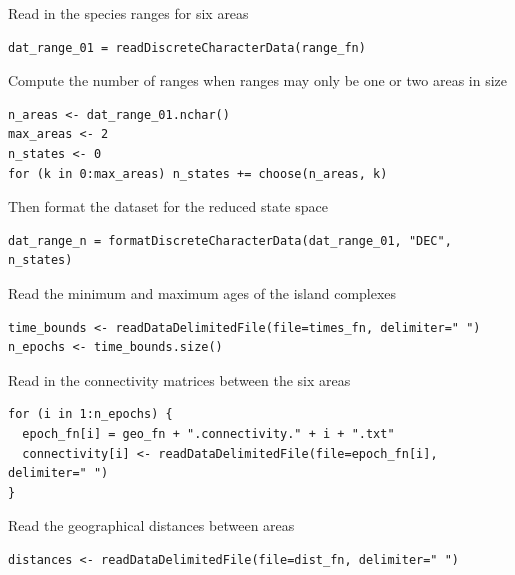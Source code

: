 Read in the species ranges for six areas

\begin{snugshade}
\begin{lstlisting}
dat_range_01 = readDiscreteCharacterData(range_fn)
\end{lstlisting}
\end{snugshade}

Compute the number of ranges when ranges may only be one or two areas in size

\begin{snugshade}
\begin{lstlisting}
n_areas <- dat_range_01.nchar()
max_areas <- 2
n_states <- 0
for (k in 0:max_areas) n_states += choose(n_areas, k)
\end{lstlisting}
\end{snugshade}

Then format the dataset for the reduced state space

\begin{snugshade}
\begin{lstlisting}
dat_range_n = formatDiscreteCharacterData(dat_range_01, "DEC", n_states)
\end{lstlisting}
\end{snugshade}

Read the minimum and maximum ages of the island complexes

\begin{snugshade}
\begin{lstlisting}
time_bounds <- readDataDelimitedFile(file=times_fn, delimiter=" ")
n_epochs <- time_bounds.size()
\end{lstlisting}
\end{snugshade}

Read in the connectivity matrices between the six areas

\begin{snugshade}
\begin{lstlisting}
for (i in 1:n_epochs) {
  epoch_fn[i] = geo_fn + ".connectivity." + i + ".txt"
  connectivity[i] <- readDataDelimitedFile(file=epoch_fn[i], delimiter=" ")
}
\end{lstlisting}
\end{snugshade}

Read the geographical distances between areas

\begin{snugshade}
\begin{lstlisting}
distances <- readDataDelimitedFile(file=dist_fn, delimiter=" ")
\end{lstlisting}
\end{snugshade}

